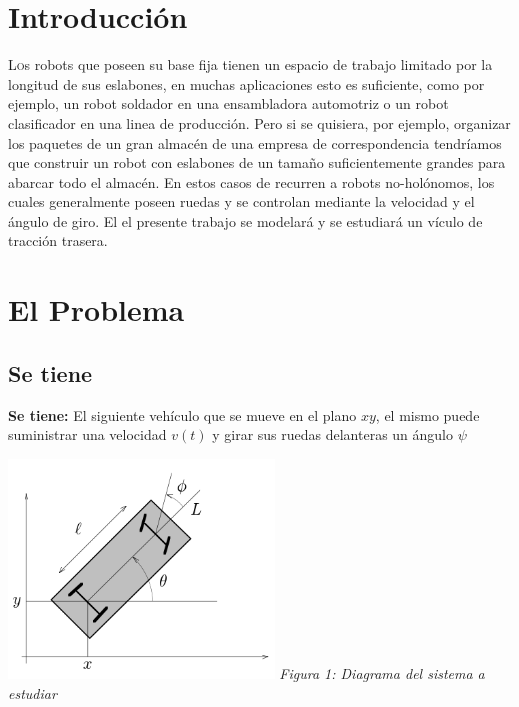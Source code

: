 \documentclass[twoside]{article}
\begin{document}
\begin{multicols}{2} %

\section{Introducción}

\lettrine[nindent=0em,lines=3]{L}os robots que poseen su base fija tienen un espacio de trabajo limitado por la longitud de sus 
eslabones, en muchas aplicaciones esto es suficiente, como por ejemplo, un robot soldador en una ensambladora automotriz o un
robot clasificador en una linea de producción. Pero si se quisiera, por ejemplo, organizar los paquetes de un gran almacén de 
una empresa de correspondencia tendríamos que construir un robot con eslabones de un tamaño suficientemente grandes para abarcar
todo el almacén. En estos casos de recurren a robots no-holónomos, los cuales generalmente poseen ruedas y se controlan mediante
la velocidad y el ángulo de giro. El el presente trabajo se modelará y se estudiará un vículo de tracción trasera.


\section{El Problema}
\subsection{Se tiene}
\textbf{Se tiene:} El siguiente vehículo que se mueve en el plano
\(xy\), el mismo puede suministrar una velocidad \(v(t)\) y girar sus
ruedas delanteras un ángulo \(\psi\) \\
\begin{center}
 \includegraphics[width=200pt,keepaspectratio=true]{./Vehiculo_traccion_trasera.png}
  \textit{Figura 1: Diagrama del sistema a estudiar}
\end{center}



\end{multicols}
\end{document}
